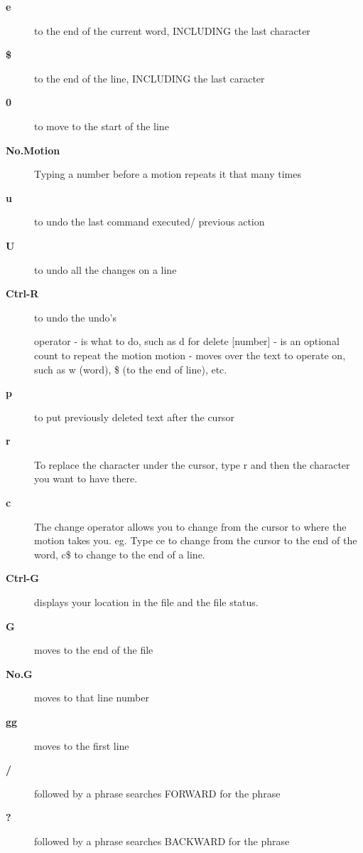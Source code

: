 \documentclass[10pt,a4paper]{scrartcl}
\begin{document}
\begin{description}
\item[\bf{e}] to the end of the current word, INCLUDING the last character

\item[\bf{\$}] to the end of the line, INCLUDING the last caracter

\item[\bf{0}] to move to the start of the line

\item[\bf{No.Motion}] Typing a number before a motion repeats it that many times

\item[\bf{u}] to undo the last command executed/ previous action

\item[\bf{U}] to undo all the changes on a line

\item[\bf{Ctrl-R}] to undo the undo's

      operator - is what to do, such as  d  for delete
      [number] - is an optional count to repeat the motion
      motion   - moves over the text to operate on, such as  w (word),
                  \$ (to the end of line), etc.

\item[\bf{p}] to put previously deleted text after the cursor

\item[\bf{r}] To replace the character under the cursor, type   r   and then the
     character you want to have there.

\item[\bf{c}]  The change operator allows you to change from the cursor to where the
     motion takes you.  eg. Type  ce  to change from the cursor to the end of
     the word,  c\$  to change to the end of a line.

\item[\bf{Ctrl-G}] displays your location in the file and the file status.

\item[\bf{G}] moves to the end of the file

\item[\bf{No.G}] moves to that line number

\item[\bf{gg}] moves to the first line

\item[\bf{/}] followed by a phrase searches FORWARD for the phrase

\item[\bf{?}] followed by a phrase searches BACKWARD for the phrase


\end{description}
\end{document}
